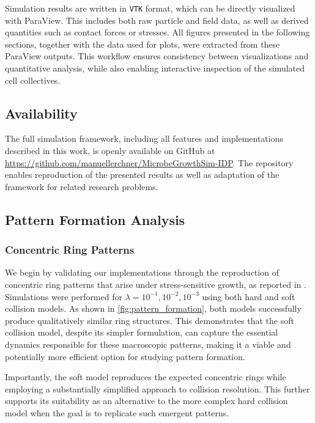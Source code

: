 \documentclass[conference]{IEEEtran}
\begin{document}
Simulation results are written in \texttt{VTK} format, which can be directly visualized with ParaView\cite{ahrens2005paraview}. This includes both raw particle and field data, as well as derived quantities such as contact forces or stresses.
All figures presented in the following sections, together with the data used for plots, were extracted from these ParaView outputs. This workflow ensures consistency between visualizations and quantitative analysis, while also enabling interactive inspection of the simulated cell collectives.


\subsection{Availability}

The full simulation framework, including all features and implementations described in this work, is openly available on GitHub at \url{https://github.com/manuellerchner/MicrobeGrowthSim-IDP}.
The repository enables reproduction of the presented results as well as adaptation of the framework for related research problems.

\subsection{Pattern Formation Analysis}

\subsubsection{Concentric Ring Patterns}

We begin by validating our implementations through the reproduction of concentric ring patterns that arise under stress-sensitive growth, as reported in \cite{Weady2024}. Simulations were performed for $\lambda = 10^{-1}, 10^{-2}, 10^{-3}$ using both hard and soft collision models. As shown in \autoref{fig:pattern_formation}, both models successfully produce qualitatively similar ring structures. This demonstrates that the soft collision model, despite its simpler formulation, can capture the essential dynamics responsible for these macroscopic patterns, making it a viable and potentially more efficient option for studying pattern formation.

Importantly, the soft model reproduces the expected concentric rings while employing a substantially simplified approach to collision resolution. This further supports its suitability as an alternative to the more complex hard collision model when the goal is to replicate such emergent patterns.
\end{document}
